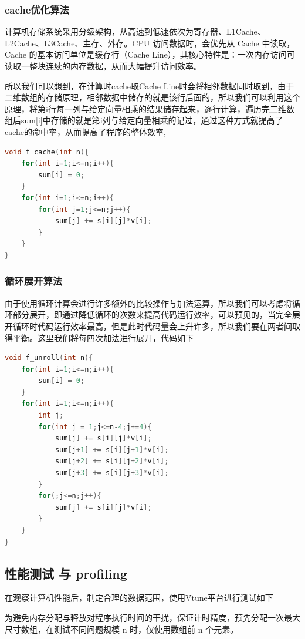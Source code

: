 \documentclass[a4paper]{article}
\begin{document}
\subsubsection{cache优化算法}
计算机存储系统采用分级架构，从高速到低速依次为寄存器、L1Cache、L2Cache、L3Cache、主存、外存。CPU 访问数据时，会优先从 Cache 中读取，Cache 的基本访问单位是缓存行（Cache Line），其核心特性是：一次内存访问可读取一整块连续的内存数据，从而大幅提升访问效率。

所以我们可以想到，在计算时cache取Cache Line时会将相邻数据同时取到，由于二维数组的存储原理，相邻数据中储存的就是该行后面的，所以我们可以利用这个原理，将第i行每一列与给定向量相乘的结果储存起来，逐行计算，遍历完二维数组后sum[i]中存储的就是第i列与给定向量相乘的记过，通过这种方式就提高了cache的命中率，从而提高了程序的整体效率,

\begin{lstlisting}[title=Cache优化算法,frame=trbl,language={C++}]
void f_cache(int n){
	for(int i=1;i<=n;i++){
		sum[i] = 0;
	}
	for(int i=1;i<=n;i++){
		for(int j=1;j<=n;j++){
			sum[j] += s[i][j]*v[i];
		}
	}
}
\end{lstlisting}

\subsubsection{循环展开算法}
由于使用循环计算会进行许多额外的比较操作与加法运算，所以我们可以考虑将循环部分展开，即通过降低循环的次数来提高代码运行效率，可以预见的，当完全展开循环时代码运行效率最高，但是此时代码量会上升许多，所以我们要在两者间取得平衡。这里我们将每四次加法进行展开，代码如下


\begin{lstlisting}[title=循环展开算法,frame=trbl,language={C++}]
void f_unroll(int n){
	for(int i=1;i<=n;i++){
		sum[i] = 0;
	}
	for(int i=1;i<=n;i++){
		int j;
		for(int j = 1;j<=n-4;j+=4){
			sum[j] += s[i][j]*v[i];
			sum[j+1] += s[i][j+1]*v[i];
			sum[j+2] += s[i][j+2]*v[i];
			sum[j+3] += s[i][j+3]*v[i];
		}
		for(;j<=n;j++){
			sum[j] += s[i][j]*v[i];
		}
	}
}
\end{lstlisting}

\subsection{性能测试 与 profiling}
在观察计算机性能后，制定合理的数据范围，使用Vtune平台进行测试如下

为避免内存分配与释放对程序执行时间的干扰，保证计时精度，预先分配一次最大尺寸数组，在测试不同问题规模 n 时，仅使用数组前 n 个元素。
\end{document}
